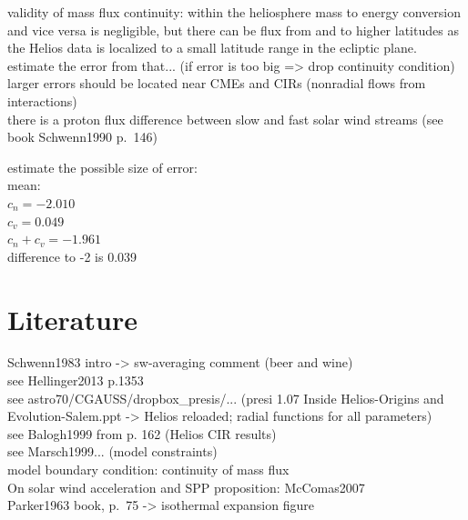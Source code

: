 validity of mass flux continuity: within the heliosphere mass to energy conversion and vice versa is negligible, but there can be flux from and to higher latitudes as the Helios data is localized to a small latitude range in the ecliptic plane.\\
estimate the error from that... (if error is too big => drop continuity condition)\\
larger errors should be located near CMEs and CIRs (nonradial flows from interactions)\\
there is a proton flux difference between slow and fast solar wind streams (see book Schwenn1990 p.~146)

estimate the possible size of error:\\
mean:\\
$c_n = -2.010$\\
$c_v = 0.049$\\
$c_n + c_v = -1.961$\\
difference to -2 is 0.039\\





\section{Literature}
Schwenn1983 intro -> sw-averaging comment (beer and wine)\\
see Hellinger2013 p.1353\\
see astro70/CGAUSS/dropbox\_presis/... (presi 1.07 Inside Helios-Origins and Evolution-Salem.ppt -> Helios reloaded; radial functions for all parameters)\\
see Balogh1999 from p. 162 (Helios CIR results)\\
see Marsch1999... (model constraints)\\
model boundary condition: continuity of mass flux\\
On solar wind acceleration and SPP proposition: McComas2007\\
Parker1963 book, p.~75 -> isothermal expansion figure\\	%

